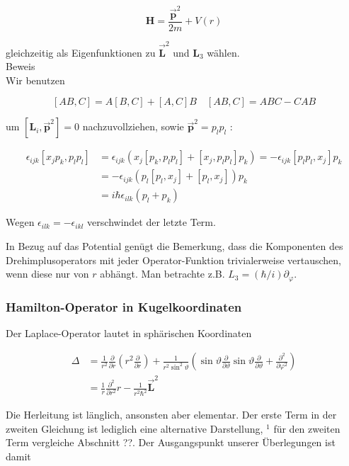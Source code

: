 \documentclass[10pt, letterpaper]{article}
\begin{document}
$$
\mathbf{H}=\frac{\overrightarrow{\mathbf{p}}^{2}}{2 m}+V(r)
$$

gleichzeitig als Eigenfunktionen zu $\overrightarrow{\mathbf{L}}^{2}$ und $\mathbf{L}_{3}$ wählen.\\
Beweis\\
Wir benutzen

$$
[A B, C]=A[B, C]+[A, C] B \quad[A B, C]=A B C-C A B
$$

um $\left[\mathbf{L}_{i}, \overrightarrow{\mathbf{p}}^{2}\right]=0$ nachzuvollziehen, sowie $\overrightarrow{\mathbf{p}}^{2}=p_{l} p_{l}$ :

$$
\begin{aligned}
\epsilon_{i j k}\left[x_{j} p_{k}, p_{l} p_{l}\right] & =\epsilon_{i j k}\left(x_{j}\left[p_{k}, p_{l} p_{l}\right]+\left[x_{j}, p_{l} p_{l}\right] p_{k}\right)=-\epsilon_{i j k}\left[p_{l} p_{l}, x_{j}\right] p_{k} \\
& =-\epsilon_{i j k}\left(p_{l}\left[p_{l}, x_{j}\right]+\left[p_{l}, x_{j}\right]\right) p_{k} \\
& =i \hbar \epsilon_{i l k}\left(p_{l}+p_{k}\right)
\end{aligned}
$$

Wegen $\epsilon_{i l k}=-\epsilon_{i k l}$ verschwindet der letzte Term.

In Bezug auf das Potential genügt die Bemerkung, dass die Komponenten des Drehimplusoperators mit jeder Operator-Funktion trivialerweise vertauschen, wenn diese nur von $r$ abhängt. Man betrachte z.B. $L_{3}=(\hbar / i) \partial_{\varphi}$.

\subsubsection*{Hamilton-Operator in Kugelkoordinaten}
Der Laplace-Operator lautet in sphärischen Koordinaten

$$
\begin{aligned}
\Delta & =\frac{1}{r^{2}} \frac{\partial}{\partial r}\left(r^{2} \frac{\partial}{\partial r}\right)+\frac{1}{r^{2} \sin ^{2} \vartheta}\left(\sin \vartheta \frac{\partial}{\partial \vartheta} \sin \vartheta \frac{\partial}{\partial \vartheta}+\frac{\partial^{2}}{\partial \varphi^{2}}\right) \\
& =\frac{1}{r} \frac{\partial^{2}}{\partial r^{2}} r-\frac{1}{r^{2} \hbar^{2}} \overrightarrow{\mathbf{L}}^{2}
\end{aligned}
$$

Die Herleitung ist länglich, ansonsten aber elementar. Der erste Term in der zweiten Gleichung ist lediglich eine alternative Darstellung, ${ }^{1}$ für den zweiten Term vergleiche Abschnitt ??. Der Ausgangspunkt unserer Überlegungen ist damit
\end{document}
